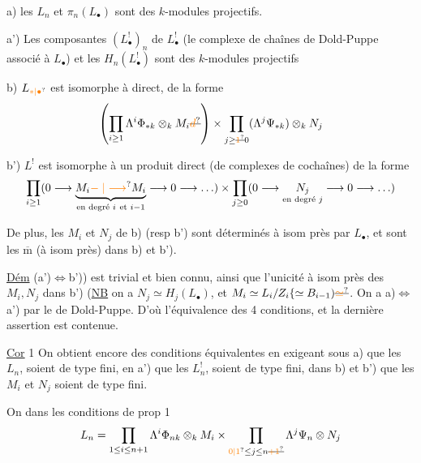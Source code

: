 a) les $L_n$ et $\pi_n(L_{\bullet})$ sont des $k$-modules projectifs.

a'{)} Les composantes  $(L_{\bullet}^!)_n$ de $L_{\bullet}^!$ (le complexe de chaînes de Dold-Puppe associé à $L_{\bullet}$) et les $H_n(L_{\bullet}^!)$ sont des $k$-modules projectifs

b) $L_{\unsure{*|\bullet}}$ est isomorphe à    direct,  de la forme
\[
\left(\prod_{i\geq1}\Lambda^i\Phi_{*k}\otimes_k M_i\deleted{\unsure{d}}\right)
 \times\prod_{j\geq\deleted{\unsure{1}}0}(\Lambda^j\Psi_{*k})\otimes_k N_j
\]

 b') $L^!$ est isomorphe à un produit direct (de complexes de cochaînes) de la forme
\[
\prod_{i\geq1}(0\longrightarrow\underbrace{M_i
 \unsure{\mathrel{-}|\longrightarrow}M_i}_{\text{en degré }i\ \text{et }i-1}
 \longrightarrow0\longrightarrow\ldots)
 \times\prod_{j\geq0}(0\longrightarrow
 \underset{\text{en degré }j}{N_j}\longrightarrow0\longrightarrow\ldots)
\]

De plus, les $M_i$ et $N_j$ de b) (resp b') sont déterminés à isom près par  $L_{\bullet}$, et  sont les $\overline{\mathrm{m}}$ (à isom près) dans b) et b').

\uline{Dém} (a'{)}$\Longleftrightarrow$b')) est trivial et bien connu, ainsi que l'unicité à isom  près des $M_i,N_j$ dans b') (\uline{NB} on a $N_j\simeq H_j(L_{\bullet})$, et $M_i\simeq L_i/Z_i\{\simeq B_{i-1})\deleted{\unsure{\simeq}}$. On a a)$\Longleftrightarrow$a')  par le  de Dold-Puppe. D'où l'équivalence des 4 conditions, et la dernière assertion est contenue.

\uline{Cor} 1   On obtient encore des conditions équivalentes en exigeant  sous a) que les $L_n$,  soient de type fini, en a') que les $L_n^!$,  soient de type fini, dans b) et b') que les $M_i$ et $N_j$ soient de type fini.

On  dans les conditions de prop 1
\[
 L_n=\prod_{1\leq i\leq n+1}\Lambda^{i}\Phi_{n k}\otimes_k M_i
 \times\prod_{\unsure{0|1}\leq j\leq n\deleted{\unsure{+1}}}\Lambda^j\Psi_n\otimes N_j
\]

